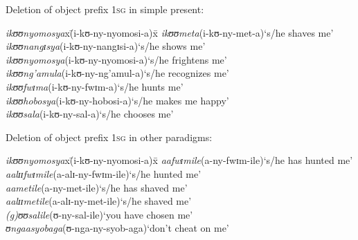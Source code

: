 \clearpage %

\begin{exe}
	\ex\label{exOM1SGDelition}\begin{xlist}
		\ex Deletion of object prefix \textsc{1sg} in simple present:
		\begin{tabbing}
			\textit{ikʊʊnyomosya}x\=(\degree i-kʊ-ny-nyomosi-a)x\= \kill
			\textit{ikʊʊmeta}\>(\degree i-kʊ-ny-met-a)\>`s/he shaves me'
			\\\textit{ikʊʊnangɪsya}\>(\degree i-kʊ-ny-nangɪsi-a)\>`s/he shows me'
			\\\textit{ikʊʊnyomosya}\>(\degree i-kʊ-ny-nyomosi-a)\>`s/he frightens me'
			\\\textit{ikʊʊng'amula}\>(\degree i-kʊ-ny-ng'amul-a)\>`s/he recognizes me'
			\\\textit{ikʊʊfwɪma}\>(\degree i-kʊ-ny-fwɪm-a)\>`s/he hunts me'
			\\\textit{ikʊʊhobosya}\>(\degree i-kʊ-ny-hobosi-a)\>`s/he makes me happy'
			\\\textit{ikʊʊsala}\>(\degree i-kʊ-ny-sal-a)\>`s/he chooses me'
		\end{tabbing}
		\ex Deletion of object prefix \textsc{1sg} in other paradigms:
		\begin{tabbing}
			\textit{ikʊʊnyomosya}x\=(\degree i-kʊ-ny-nyomosi-a)x\= \kill
			\textit{aafwɪmile}\>(\degree a-ny-fwɪm-ile)\>`s/he has hunted me'
			\\\textit{aalɪɪfwɪmile}\>(\degree a-alɪ-ny-fwɪm-ile)\>`s/he hunted me'
			\\\textit{aametile}\>(\degree a-ny-met-ile)\>`s/he has shaved me'
			\\\textit{aalɪɪmetile}\>(\degree a-alɪ-ny-met-ile)\>`s/he shaved me'
			\\\textit{(g)ʊʊsalile}\>(\degree ʊ-ny-sal-ile)\>`you have chosen me'
			\\\textit{ʊngaasyobaga}\>(\degree ʊ-nga-ny-syob-aga)\>`don't cheat on me'
		\end{tabbing}
	\end{xlist}
\end{exe}
